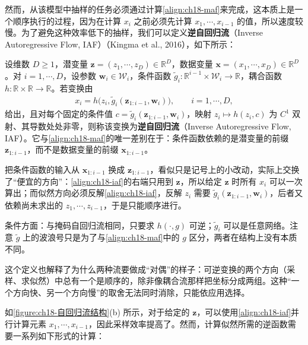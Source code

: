 \documentclass[../../main.tex]{subfiles}
\begin{document}
然而，从该模型中抽样的任务必须通过计算\eqref{align:ch18-maf}来完成，这本质上是一个顺序执行的过程，因为在计算 $x_i$ 之前必须先计算 $x_1,\cdots,x_{i-1}$ 的值，所以速度较慢。为了避免这种效率低下的抽样，我们可以定义\textbf{逆自回归流}（Inverse Autoregressive Flow, IAF）（Kingma et al., 2016），如下所示：

\begin{definition}[逆自回归流]\label{definition:ch18-逆自回归流}
设维数 $D\geqslant1$，潜变量 $\bm{z}=(z_1,\cdots,z_D)\in\mathbb{R}^{D}$，数据变量 $\bm{x}=(x_1,\cdots,x_D)\in\mathbb{R}^{D}$。对 $i=1,\cdots,D$，设参数 $\bm{w}_i\in\mathcal{W}_i$，条件函数 $\tilde{g}_i:\mathbb{R}^{i-1}\times\mathcal{W}_i\to\mathbb{R}$，耦合函数 $h:\mathbb{R}\times\mathbb{R}\to\mathbb{R}$。若变换由
\begin{align}
  x_i=h\big(z_i,\tilde{g}_i(\bm{z}_{1:i-1},\bm{w}_i)\big),\qquad i=1,\cdots,D,
  \label{align:ch18-iaf}
\end{align}
给出，且对每个固定的条件值 $c=\tilde{g}_i(\bm{z}_{1:i-1},\bm{w}_i)$，映射 $z_i\mapsto h(z_i,c)$ 为 $C^{1}$ 双射、其导数处处非零，则称该变换为\textbf{逆自回归流}（Inverse Autoregressive Flow, IAF）。它与\eqref{align:ch18-maf}的唯一差别在于：条件函数依赖的是潜变量的前缀 $\bm{z}_{1:i-1}$，而不是数据变量的前缀 $\bm{x}_{1:i-1}$。
\end{definition}

\begin{remark}
把条件函数的输入从 $\bm{x}_{1:i-1}$ 换成 $\bm{z}_{1:i-1}$，看似只是记号上的小改动，实际上交换了“便宜的方向”：\eqref{align:ch18-iaf}的右端只用到 $\bm{z}$，所以给定 $\bm{z}$ 时所有 $x_i$ 可以一次算出；而似然方向必须反解\eqref{align:ch18-iaf}，反解 $z_i$ 需要 $\tilde{g}_i(\bm{z}_{1:i-1},\bm{w}_i)$，后者又依赖尚未求出的 $z_1,\cdots,z_{i-1}$，于是只能顺序进行。

条件方面：与掩码自回归流相同，只要求 $h(\cdot,g)$ 可逆；$\tilde{g}_i$ 可以是任意网络。注意 $\tilde{g}$ 上的波浪号只是为了与\eqref{align:ch18-maf}中的 $g$ 区分，两者在结构上没有本质不同。

这个定义也解释了为什么两种流要做成“对偶”的样子：可逆变换的两个方向（采样、求似然）中总有一个是顺序的，除非像耦合流那样把坐标分成两组。这种“一个方向快、另一个方向慢”的取舍无法同时消除，只能依应用选择。
\end{remark}

如\cref{figure:ch18-自回归流结构}(b) 所示，对于给定的 $\bm{z}$，可以使用\eqref{align:ch18-iaf}并行计算元素 $x_1,\cdots,x_{i-1}$，因此采样效率提高了。然而，计算似然所需的逆函数需要一系列如下形式的计算：
\end{document}
